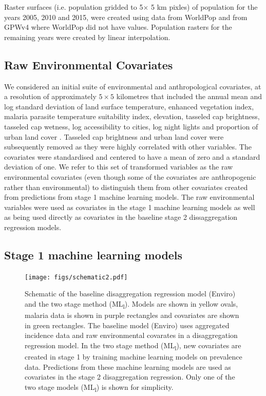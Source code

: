 \documentclass[review]{elsarticle}
\begin{document}
Raster surfaces (i.e. population gridded to 5$ \times$ 5 km pixles) of population for the years 2005, 2010 and 2015, were created using data from WorldPop \citep{linard2012population,gaughan2013high,  sorichetta2015high} and from GPWv4 \citep{gpw4} where WorldPop did not have values. 
Population rasters for the remaining years were created by linear interpolation. 

\subsection{Raw Environmental Covariates}

We considered an initial suite of environmental and anthropological covariates, at a resolution of approximately $5 \times 5$ kilometres that included the annual mean and log standard deviation of land surface temperature, enhanced vegetation index, malaria parasite temperature suitability index, elevation, tasseled cap brightness, tasseled cap wetness, log accessibility to cities, log night lights and proportion of urban land cover \citep{weiss2014air, weiss2015re, weiss2018global}. 
Tasseled cap brightness and urban land cover were subsequently removed as they were highly correlated with other variables. 
The covariates were standardised and centered to have a mean of zero and a standard deviation of one. 
We refer to this set of transformed variables as the raw environmental covariates (even though some of the covariates are anthropogenic rather than environmental) to distinguish them from other covariates created from predictions from stage 1 machine learning models.
The raw environmental variables were used as covariates in the stage 1 machine learning models as well as being used directly as covariates in the baseline stage 2 dissaggregation regression models.



\subsection{Stage 1 machine learning models}


\begin{figure}[t!]
  \centering
  \texttt{[image: figs/schematic2.pdf]}
\caption{
  Schematic of the baseline disaggregation regression model (Enviro) and the two stage method (ML\textsubscript{l}). 
  Models are shown in yellow ovals, malaria data is shown in purple rectangles and covariates are shown in green rectangles.
  The baseline model (Enviro) uses aggregated incidence data and raw environmental covarates in a disaggregation regression model.
  In the two stage method (ML\textsubscript{l}), new covariates are created in stage 1 by training machine learning models on prevalence data.
  Predictions from these machine learning models are used as covariates in the stage 2 disaggregation regression.
  Only one of the two stage models (ML\textsubscript{l}) is shown for simplicity.
}
\label{f:schem}
\end{figure}
\end{document}
